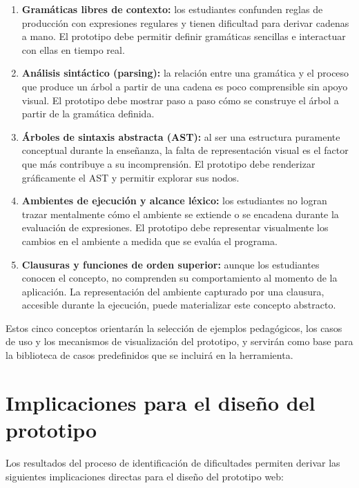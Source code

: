 \begin{enumerate}
    \item \textbf{Gramáticas libres de contexto:} los estudiantes confunden reglas de producción con expresiones regulares y tienen dificultad para derivar cadenas a mano. El prototipo debe permitir definir gramáticas sencillas e interactuar con ellas en tiempo real.

    \item \textbf{Análisis sintáctico (parsing):} la relación entre una gramática y el proceso que produce un árbol a partir de una cadena es poco comprensible sin apoyo visual. El prototipo debe mostrar paso a paso cómo se construye el árbol a partir de la gramática definida.

    \item \textbf{Árboles de sintaxis abstracta (AST):} al ser una estructura puramente conceptual durante la enseñanza, la falta de representación visual es el factor que más contribuye a su incomprensión. El prototipo debe renderizar gráficamente el AST y permitir explorar sus nodos.

    \item \textbf{Ambientes de ejecución y alcance léxico:} los estudiantes no logran trazar mentalmente cómo el ambiente se extiende o se encadena durante la evaluación de expresiones. El prototipo debe representar visualmente los cambios en el ambiente a medida que se evalúa el programa.

    \item \textbf{Clausuras y funciones de orden superior:} aunque los estudiantes conocen el concepto, no comprenden su comportamiento al momento de la aplicación. La representación del ambiente capturado por una clausura, accesible durante la ejecución, puede materializar este concepto abstracto.
\end{enumerate}

Estos cinco conceptos orientarán la selección de ejemplos pedagógicos, los casos de uso y los mecanismos de visualización del prototipo, y servirán como base para la biblioteca de casos predefinidos que se incluirá en la herramienta.

\section{Implicaciones para el diseño del prototipo}

Los resultados del proceso de identificación de dificultades permiten derivar las siguientes implicaciones directas para el diseño del prototipo web:

